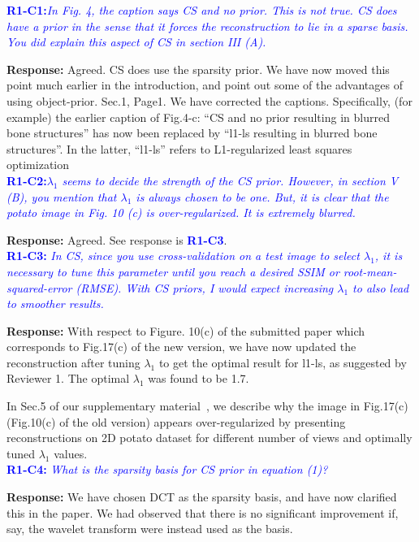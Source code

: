\documentclass{article}
\begin{document}
\textcolor{blue}{\textbf{R1-C1:}\textit{In Fig. 4, the caption says CS and no prior. This is not true. CS does have a prior in the sense that it forces the reconstruction to lie in a sparse basis. You did explain this aspect of CS in section III (A).}}

\textbf{Response:} Agreed.  CS does use the sparsity prior. We have now moved this point much earlier in the introduction, and point out some of the advantages of using object-prior. Sec.1, Page1. We have corrected the captions. Specifically, (for example) the earlier caption of Fig.4-c: ``CS and no prior resulting in blurred bone structures'' has now been replaced by ``l1-ls resulting in blurred bone structures''. In the latter, ``l1-ls'' refers to L1-regularized least squares optimization \\

\textcolor{blue}{\textbf{R1-C2:}\textit{$\lambda_1$ seems to decide the strength of the CS prior. However, in section V (B), you mention that $\lambda_1$ is always chosen to be one. But, it is clear that the potato image in Fig. 10 (c) is over-regularized. It is extremely blurred.}}

\textbf{Response:} Agreed. See response is \textcolor{blue}{\textbf{R1-C3}}.\\

\textcolor{blue}{\textbf{R1-C3:}\textit{ In CS, since you use cross-validation on a test image to select $\lambda_1$, it is necessary to tune this parameter until you reach a desired SSIM or root-mean-squared-error (RMSE). With CS priors, I would expect increasing $\lambda_1$ to also lead to smoother results.}}  

\textbf{Response:} With respect to Figure. 10(c) of the submitted paper which corresponds to Fig.17(c) of the new version, we have now updated the reconstruction after tuning $\lambda_1$ to get the optimal result for l1-ls, as suggested by Reviewer 1. The optimal $\lambda_1$ was found to be 1.7. 

In Sec.5 of our supplementary material~\cite{supp_paper}, we describe why the image in Fig.17(c) (Fig.10(c) of the old version) appears over-regularized by presenting reconstructions on 2D potato dataset for different number of views and optimally tuned $\lambda_1$ values.   \\

\textcolor{blue}{\textbf{R1-C4:}\textit{ What is the sparsity basis for CS prior in equation (1)? }}

\textbf{Response:} We have chosen DCT as the sparsity basis, and have now clarified this in the paper. We had observed that there is no significant improvement if, say, the wavelet transform were instead used as the basis.\\
\end{document}
